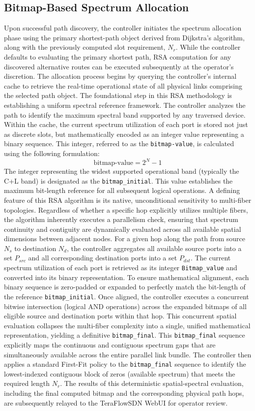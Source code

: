 \subsection{Bitmap-Based Spectrum Allocation}
Upon successful path discovery, the controller initiates the spectrum allocation phase using the primary shortest-path object derived from Dijkstra's algorithm, along with the previously computed slot requirement, $N_r$. While the controller defaults to evaluating the primary shortest path, RSA computation for any discovered alternative routes can be executed subsequently at the operator's discretion. The allocation process begins by querying the controller's internal cache to retrieve the real-time operational state of all physical links comprising the selected path object. The foundational step in this RSA methodology is establishing a uniform spectral reference framework. The controller analyzes the path to identify the maximum spectral band supported by any traversed device. Within the cache, the current spectrum utilization of each port is stored not just as discrete slots, but mathematically encoded as an integer value representing a binary sequence. This integer, referred to as the \texttt{bitmap-value}, is calculated using the following formulation:
\[
    \text{bitmap-value} = 2^N - 1
\]
The integer representing the widest supported operational band (typically the C+L band) is designated as the \texttt{bitmap\_initial}. This value establishes the maximum bit-length reference for all subsequent logical operations. A defining feature of this RSA algorithm is its native, unconditional sensitivity to multi-fiber topologies. Regardless of whether a specific hop explicitly utilizes multiple fibers, the algorithm inherently executes a parallelism check, ensuring that spectrum continuity and contiguity are dynamically evaluated across all available spatial dimensions between adjacent nodes. For a given hop along the path from source $N_s$ to destination $N_d$, the controller aggregates all available source ports into a set $P_{src}$ and all corresponding destination ports into a set $P_{dst}$. The current spectrum utilization of each port is retrieved as its integer \texttt{Bitmap\_value} and converted into its binary representation. To ensure mathematical alignment, each binary sequence is zero-padded or expanded to perfectly match the bit-length of the reference \texttt{bitmap\_initial}. Once aligned, the controller executes a concurrent bitwise intersection (logical AND operations) across the expanded bitmaps of all eligible source and destination ports within that hop. This concurrent spatial evaluation collapses the multi-fiber complexity into a single, unified mathematical representation, yielding a definitive \texttt{bitmap\_final}. This \texttt{bitmap\_final} sequence explicitly maps the continuous and contiguous spectrum gaps that are simultaneously available across the entire parallel link bundle. The controller then applies a standard First-Fit policy to the \texttt{bitmap\_final} sequence to identify the lowest-indexed contiguous block of zeros (available spectrum) that meets the required length $N_r$. The results of this deterministic spatial-spectral evaluation, including the final computed bitmap and the corresponding physical path hops, are subsequently relayed to the TeraFlowSDN WebUI for operator review.
